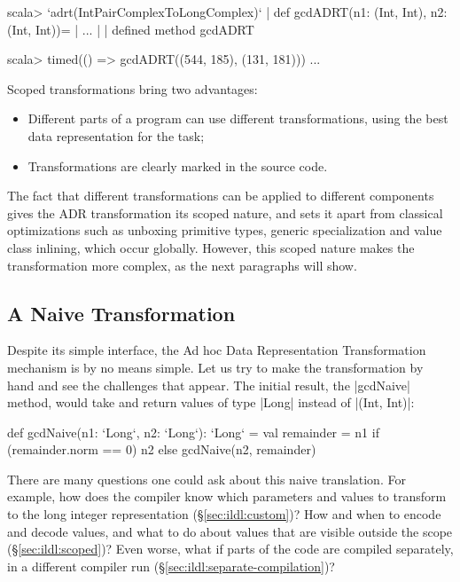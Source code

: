 \begin{lstlisting-nobreak}
scala> `adrt(IntPairComplexToLongComplex)` {
       |   def gcdADRT(n1: (Int, Int), n2: (Int, Int))={
       |     ...
       |   }
       | }
defined method gcdADRT

scala> timed(() => gcdADRT((544, 185), (131, 181)))
...
\end{lstlisting-nobreak}

Scoped transformations bring two advantages:

\vspace{0.25em}
\begin{itemize}
 \item Different parts of a program can use different transformations, using the best data representation for the task;
 \item Transformations are clearly marked in the source code.
\end{itemize}
\vspace{0.25em}

The fact that different transformations can be applied to different components gives the ADR transformation its scoped nature, and sets it apart from classical optimizations such as unboxing primitive types, generic specialization and value class inlining, which occur globally. However, this scoped nature makes the transformation more complex, as the next paragraphs will show.

\subsection{A Naive Transformation}

Despite its simple interface, the Ad hoc Data Representation Transformation mechanism is by no means simple. Let us try to make the transformation by hand and see the challenges that appear. The initial result, the |gcdNaive| method, would take and return values of type |Long| instead of |(Int, Int)|:

\begin{lstlisting-nobreak}
def gcdNaive(n1: `Long`, n2: `Long`): `Long` = {
  val remainder = n1 %
  if (remainder.norm == 0) n2 else gcdNaive(n2, remainder)
}
\end{lstlisting-nobreak}

There are many questions one could ask about this naive translation. For example, how does the compiler know which parameters and values to transform to the long integer representation (\S\ref{sec:ildl:custom})? How and when to encode and decode values, and what to do about values that are visible outside the scope (\S\ref{sec:ildl:scoped})? Even worse, what if parts of the code are compiled separately, in a different compiler run (\S\ref{sec:ildl:separate-compilation})?

